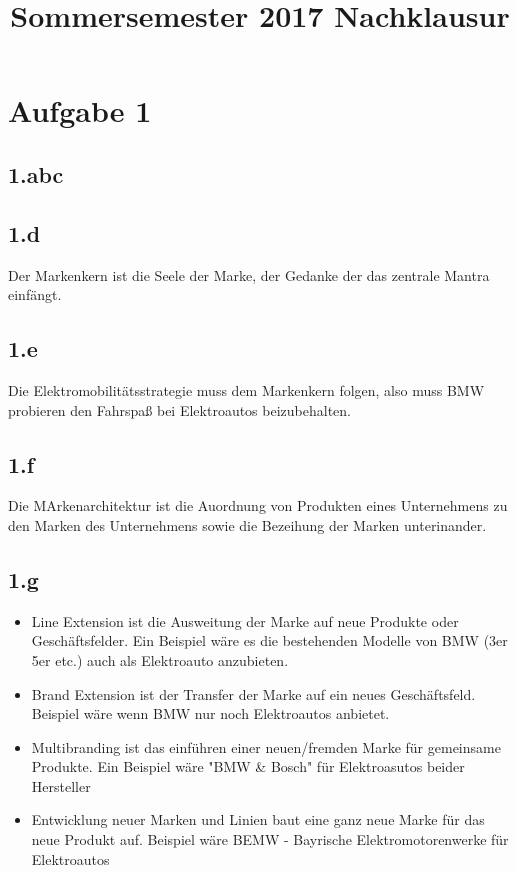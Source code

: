 

\title{Sommersemester 2017 Nachklausur}
\maketitle



\section{Aufgabe 1}
\subsection{1.abc}

\subsection{1.d}
    Der Markenkern ist die Seele der Marke, der Gedanke der das zentrale Mantra einfängt.

\subsection{1.e}
    Die Elektromobilitätsstrategie muss dem Markenkern folgen, also muss BMW probieren den Fahrspaß bei Elektroautos beizubehalten.

\subsection{1.f}
    Die MArkenarchitektur ist die Auordnung von Produkten eines Unternehmens zu den Marken des Unternehmens sowie die Bezeihung der Marken unterinander.

\subsection{1.g}
    \begin{itemize}
        \item Line Extension ist die Ausweitung der Marke auf neue Produkte oder Geschäftsfelder. Ein Beispiel wäre es die bestehenden Modelle von BMW (3er 5er etc.) auch als Elektroauto anzubieten.
        \item Brand Extension ist der Transfer der Marke auf ein neues Geschäftsfeld. Beispiel wäre wenn BMW nur noch Elektroautos anbietet.
        \item Multibranding ist das einführen einer neuen/fremden Marke für gemeinsame Produkte. Ein Beispiel wäre "BMW & Bosch" für Elektroasutos beider Hersteller
        \item Entwicklung neuer Marken und Linien baut eine ganz neue Marke für das neue Produkt auf. Beispiel wäre BEMW - Bayrische Elektromotorenwerke für Elektroautos
    \end{itemize}

